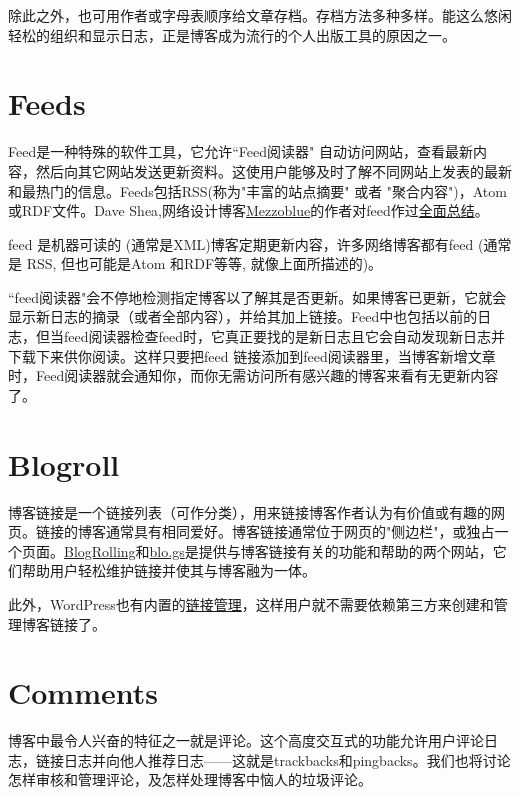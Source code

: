 除此之外，也可用作者或字母表顺序给文章存档。存档方法多种多样。能这么悠闲轻松的组织和显示日志，正是博客成为流行的个人出版工具的原因之一。

\section{Feeds}

Feed是一种特殊的软件工具，它允许``Feed阅读器" 自动访问网站，查看最新内容，然后向其它网站发送更新资料。这使用户能够及时了解不同网站上发表的最新和最热门的信息。Feeds包括RSS(称为"丰富的站点摘要" 或者 "聚合内容")，Atom或RDF文件。Dave Shea,网络设计博客\href{http://mezzoblue.com/}{Mezzoblue}的作者对feed作过\href{http://www.mezzoblue.com/archives/2004/05/19/what_is_rssx/}{全面总结}。

feed 是机器可读的 (通常是XML)博客定期更新内容，许多网络博客都有feed (通常是 RSS, 但也可能是Atom 和RDF等等, 就像上面所描述的)。

``feed阅读器"会不停地检测指定博客以了解其是否更新。如果博客已更新，它就会显示新日志的摘录（或者全部内容），并给其加上链接。Feed中也包括以前的日志，但当feed阅读器检查feed时，它真正要找的是新日志且它会自动发现新日志并下载下来供你阅读。这样只要把feed 链接添加到feed阅读器里，当博客新增文章时，Feed阅读器就会通知你，而你无需访问所有感兴趣的博客来看有无更新内容了。

\section{Blogroll}

博客链接是一个链接列表（可作分类），用来链接博客作者认为有价值或有趣的网页。链接的博客通常具有相同爱好。博客链接通常位于网页的"侧边栏"，或独占一个页面。\href{http://blogrolling.com/}{BlogRolling}和\href{http://blo.gs/}{blo.gs}是提供与博客链接有关的功能和帮助的两个网站，它们帮助用户轻松维护链接并使其与博客融为一体。

此外，WordPress也有内置的\href{http://codex.wordpress.org/Links_Manager}{链接管理}，这样用户就不需要依赖第三方来创建和管理博客链接了。





\section{Comments}

博客中最令人兴奋的特征之一就是评论。这个高度交互式的功能允许用户评论日志，链接日志并向他人推荐日志——这就是trackbacks和pingbacks。我们也将讨论怎样审核和管理评论，及怎样处理博客中恼人的垃圾评论。

